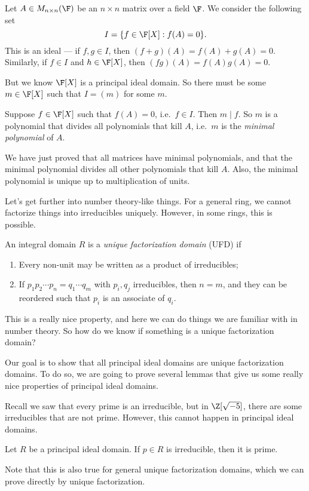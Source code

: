 \documentclass[a4paper]{article}
\begin{document}
\begin{eg}
  Let $A \in M_{n \times n}(\F)$ be an $n \times n$ matrix over a field $\F$. We consider the following set
  \[
    I = \{f \in \F[X]: f(A) = 0\}.
  \]
  This is an ideal --- if $f, g \in I$, then $(f + g)(A) = f(A) + g(A) = 0$. Similarly, if $f \in I$ and $h \in \F[X]$, then $(fg)(A) = f(A)g(A) = 0$.

  But we know $\F[X]$ is a principal ideal domain. So there must be some $m \in \F[X]$ such that $I = (m)$ for some $m$.

  Suppose $f \in \F[X]$ such that $f(A) = 0$, i.e.\ $f \in I$. Then $m \mid f$. So $m$ is a polynomial that divides all polynomials that kill $A$, i.e.\ $m$ is the \emph{minimal polynomial} of $A$.

  We have just proved that all matrices have minimal polynomials, and that the minimal polynomial divides all other polynomials that kill $A$. Also, the minimal polynomial is unique up to multiplication of units.
\end{eg}

Let's get further into number theory-like things. For a general ring, we cannot factorize things into irreducibles uniquely. However, in some rings, this is possible.
\begin{defi}
  An integral domain $R$ is a \emph{unique factorization domain} (UFD) if
  \begin{enumerate}
    \item Every non-unit may be written as a product of irreducibles;
    \item If $p_1 p_2 \cdots p_n = q_1 \cdots q_m$ with $p_i, q_j$ irreducibles, then $n = m$, and they can be reordered such that $p_i$ is an associate of $q_i$.
  \end{enumerate}
\end{defi}
This is a really nice property, and here we can do things we are familiar with in number theory. So how do we know if something is a unique factorization domain?

Our goal is to show that all principal ideal domains are unique factorization domains. To do so, we are going to prove several lemmas that give us some really nice properties of principal ideal domains.

Recall we saw that every prime is an irreducible, but in $\Z[\sqrt{-5}]$, there are some irreducibles that are not prime. However, this cannot happen in principal ideal domains.
\begin{lemma}
  Let $R$ be a principal ideal domain. If $p \in R$ is irreducible, then it is prime.
\end{lemma}
Note that this is also true for general unique factorization domains, which we can prove directly by unique factorization.
\end{document}
